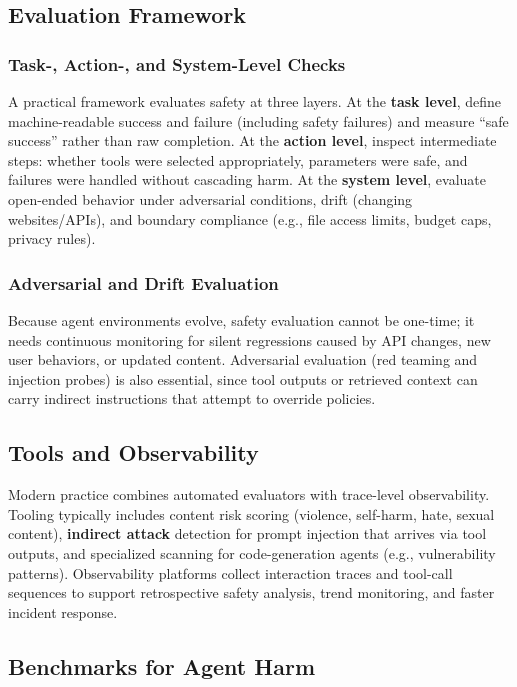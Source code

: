 \begin{TNtwocol}
\subsection*{Evaluation Framework}

\subsubsection*{Task-, Action-, and System-Level Checks}
A practical framework evaluates safety at three layers. At the \textbf{task level}, define machine-readable success and failure (including safety failures) and measure ``safe success'' rather than raw completion. At the \textbf{action level}, inspect intermediate steps: whether tools were selected appropriately, parameters were safe, and failures were handled without cascading harm. At the \textbf{system level}, evaluate open-ended behavior under adversarial conditions, drift (changing websites/APIs), and boundary compliance (e.g., file access limits, budget caps, privacy rules).

\subsubsection*{Adversarial and Drift Evaluation}
Because agent environments evolve, safety evaluation cannot be one-time; it needs continuous monitoring for silent regressions caused by API changes, new user behaviors, or updated content. Adversarial evaluation (red teaming and injection probes) is also essential, since tool outputs or retrieved context can carry indirect instructions that attempt to override policies.

\subsection*{Tools and Observability}
Modern practice combines automated evaluators with trace-level observability. Tooling typically includes content risk scoring (violence, self-harm, hate, sexual content), \textbf{indirect attack} detection for prompt injection that arrives via tool outputs, and specialized scanning for code-generation agents (e.g., vulnerability patterns). Observability platforms collect interaction traces and tool-call sequences to support retrospective safety analysis, trend monitoring, and faster incident response.

\subsection*{Benchmarks for Agent Harm}


\end{TNtwocol}
